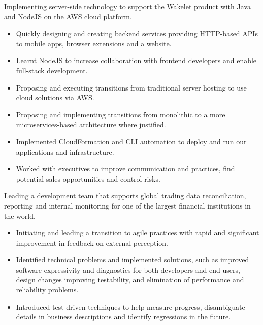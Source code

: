 \documentclass[11pt,a4paper,sans]{moderncv}        %
\begin{document}
{Implementing server-side technology to support the Wakelet product with Java and NodeJS on the AWS cloud platform.
\newline{}
\begin{itemize}
\item Quickly designing and creating backend services providing HTTP-based APIs to mobile apps, browser extensions and a website.
\item Learnt NodeJS to increase collaboration with frontend developers and enable full-stack development.
\item Proposing and executing transitions from traditional server hosting to use cloud solutions via AWS.
\item Proposing and implementing transitions from monolithic to a more microservices-based architecture where justified.
\item Implemented CloudFormation and CLI automation to deploy and run our applications and infrastructure.
\item Worked with executives to improve communication and practices, find potential sales opportunities and control risks.
\end{itemize}
}

{Leading a development team that supports global trading data reconciliation, reporting and internal monitoring for one of the largest financial institutions in the world.
\newline{}
\begin{itemize}
\item Initiating and leading a transition to agile practices with rapid and significant improvement in feedback on external perception.
\item Identified technical problems and implemented solutions, such as improved software expressivity and diagnostics for both developers and end users, design changes improving testability, and elimination of performance and reliability problems.
\item Introduced test-driven techniques to help measure progress, disambiguate details in business descriptions and identify regressions in the future.
\end{itemize}
}
\end{document}

